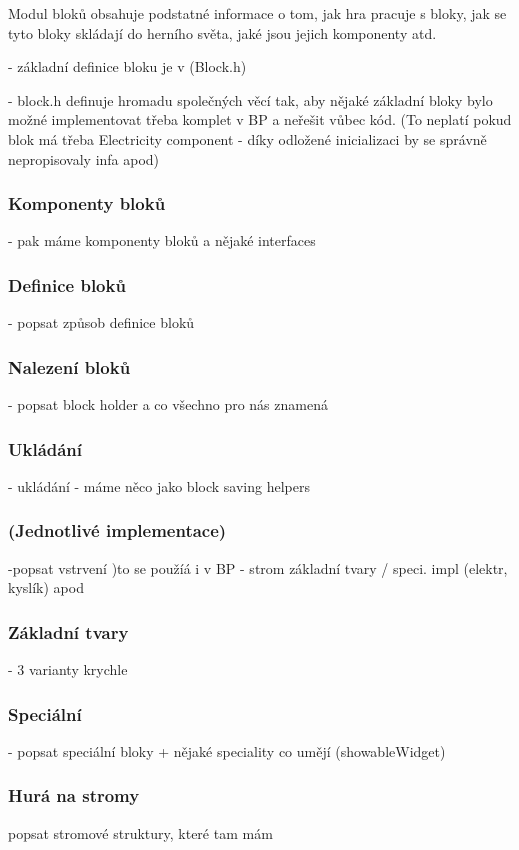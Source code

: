 
Modul bloků obsahuje podstatné informace o tom, jak hra pracuje s bloky, jak se tyto bloky skládají do herního světa, jaké jsou jejich komponenty atd. 

- základní definice bloku je v (Block.h)

- block.h definuje hromadu společných věcí tak, aby nějaké základní bloky bylo možné implementovat třeba komplet v BP a neřešit vůbec kód. (To neplatí pokud blok má třeba Electricity component - díky odložené inicializaci by se správně nepropisovaly infa apod)

\subsubsection{Komponenty bloků}
- pak máme komponenty bloků a nějaké interfaces

\subsubsection{Definice bloků}
- popsat způsob definice bloků

\subsubsection{Nalezení bloků}
- popsat block holder a co všechno pro nás znamená


\subsubsection{Ukládání}

- ukládání - máme něco jako block saving helpers

\subsubsection{(Jednotlivé implementace)}

-popsat vstrvení )to se použíá i v BP
 - strom základní tvary / speci. impl (elektr, kyslík) apod

\subsubsection{Základní tvary}
- 3 varianty krychle

\subsubsection{Speciální}
- popsat speciální bloky + nějaké speciality co umějí (showableWidget)


\subsubsection{Hurá na stromy}
popsat stromové struktury, které tam mám